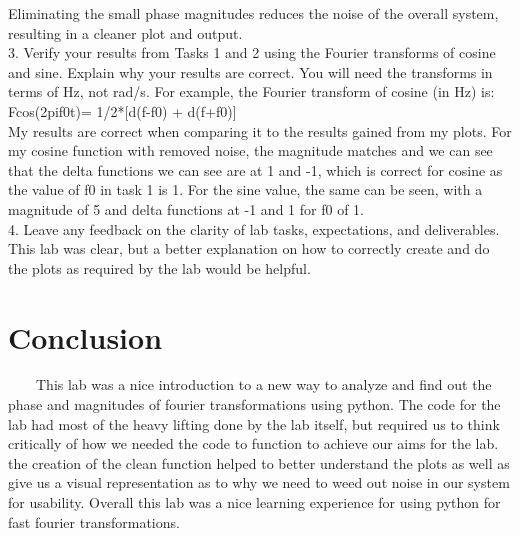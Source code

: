 \documentclass[11pt,a4]{article}
\begin{document}
Eliminating the small phase magnitudes reduces the noise of the overall system, resulting in a cleaner plot and output.\\

3. Verify your results from Tasks 1 and 2 using the Fourier transforms of cosine and sine. Explain why your results are correct. You will need the transforms in terms of Hz, not rad/s. For example, the Fourier transform of cosine (in Hz) is: F{cos(2pif0t)}= 1/2*[d(f-f0) + d(f+f0)]\\

My results are correct when comparing it to the results gained from my plots. For my cosine function with removed noise, the magnitude matches and we can see that the delta functions we can see are at 1 and -1, which is correct for cosine as the value of f0 in task 1 is 1. For the sine value, the same can be seen, with a magnitude of 5 and delta functions at -1 and 1 for f0 of 1.\\

4. Leave any feedback on the clarity of lab tasks, expectations, and deliverables.\\

This lab was clear, but a better explanation on how to correctly create and do the plots as required by the lab would be helpful.

\section{Conclusion}

\ \ \ \ This lab was a nice introduction to a new way to analyze and find out the phase and magnitudes of fourier transformations using python. The code for the lab had most of the heavy lifting done by the lab itself, but required us to think critically of how we needed the code to function to achieve our aims for the lab. the creation of the clean function helped to better understand the plots as well as give us a visual representation as to why we need to weed out noise in our system for usability. Overall this lab was a nice learning experience for using python for fast fourier transformations.
\end{document}

